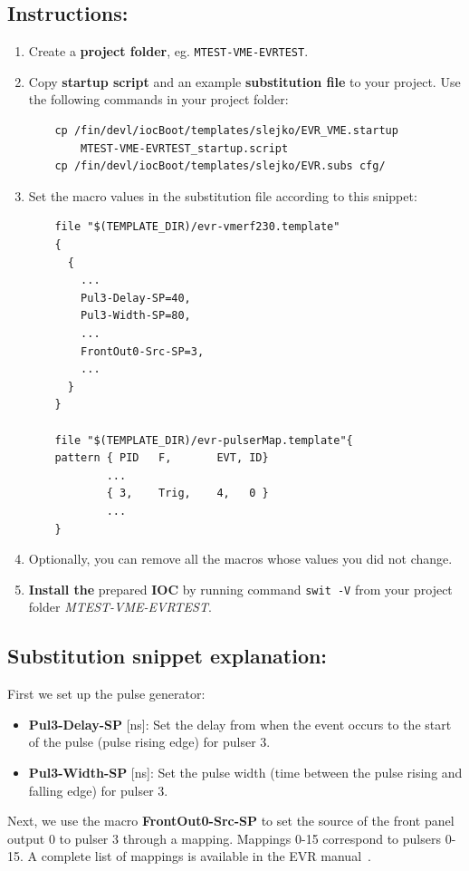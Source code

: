 \documentclass[12pt,a4paper]{article}
\begin{document}
\subsection{Instructions:}
\begin{enumerate}
	\item Create a \textbf{project folder}, eg. \texttt{MTEST-VME-EVRTEST}.
	\item Copy \textbf{startup script} and an example \textbf{substitution file} to your project. Use the following commands in your project folder:
\begin{verbatim}
	cp /fin/devl/iocBoot/templates/slejko/EVR_VME.startup 
	    MTEST-VME-EVRTEST_startup.script
	cp /fin/devl/iocBoot/templates/slejko/EVR.subs cfg/
\end{verbatim}

	\item Set the macro values in the substitution file according to this snippet:
\begin{verbatim}
	file "$(TEMPLATE_DIR)/evr-vmerf230.template"
	{
	  {
	    ...
	    Pul3-Delay-SP=40,
	    Pul3-Width-SP=80,
	    ...
	    FrontOut0-Src-SP=3,
	    ...
	  }
	}

	file "$(TEMPLATE_DIR)/evr-pulserMap.template"{
	pattern { PID   F,       EVT, ID}
	        ...
	        { 3,    Trig,    4,   0 }
	        ...
	}
\end{verbatim}

	\item Optionally, you can remove all the macros whose values you did not change. 
	\item \textbf{Install the} prepared \textbf{IOC} by running command \texttt{swit -V} from your project folder \textit{MTEST-VME-EVRTEST}.
\end{enumerate}
\subsection{Substitution snippet explanation:}

First we set up the pulse generator:
\begin{itemize}
	\item \textbf{Pul3-Delay-SP} [ns]: Set the delay from when the event occurs to the start of the pulse (pulse rising edge) for pulser 3. 
	\item \textbf{Pul3-Width-SP} [ns]: Set the pulse width (time between the pulse rising and falling edge) for pulser 3.
\end{itemize}

Next, we use the macro  \textbf{FrontOut0-Src-SP} to set the source of the front panel output 0  to pulser 3 through a mapping. Mappings 0-15 correspond to pulsers 0-15. A complete list of mappings is available in the EVR manual~\cite{evr_manual}.
\end{document}
